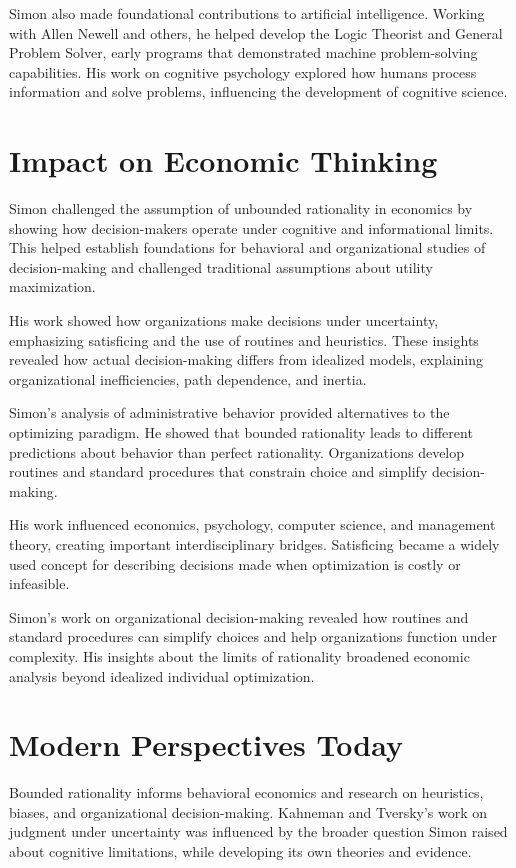 Simon also made foundational contributions to artificial intelligence.
Working with Allen Newell and others, he helped develop the Logic Theorist and
General Problem Solver, early programs that demonstrated machine
problem-solving capabilities. His work on
cognitive psychology explored how humans process information and solve
problems, influencing the development of cognitive science.

\section{Impact on Economic Thinking}
Simon challenged the assumption of unbounded rationality in economics by
showing how decision-makers operate under cognitive and informational limits.
This helped establish foundations for behavioral and organizational studies of
decision-making and challenged traditional assumptions about utility
maximization.

His work showed how organizations make decisions under uncertainty,
emphasizing satisficing and the use of routines and heuristics. These insights
revealed how actual decision-making differs from idealized models,
explaining organizational inefficiencies, path dependence, and inertia.

Simon's analysis of administrative behavior provided alternatives to the
optimizing paradigm. He showed that bounded rationality leads to different
predictions about behavior than perfect rationality. Organizations develop
routines and standard procedures that constrain choice and simplify
decision-making.

His work influenced economics, psychology, computer science, and management
theory, creating important interdisciplinary bridges. Satisficing became a
widely used concept for describing decisions made when optimization is costly
or infeasible.

Simon's work on organizational decision-making revealed how routines and
standard procedures can simplify choices and help organizations function under
complexity. His insights about the limits of rationality
broadened economic analysis beyond idealized individual optimization.

\section{Modern Perspectives Today}
Bounded rationality informs behavioral economics and research on heuristics,
biases, and organizational decision-making. Kahneman and Tversky's work on
judgment under uncertainty was influenced by the broader question Simon raised
about cognitive limitations, while developing its own theories and evidence.

